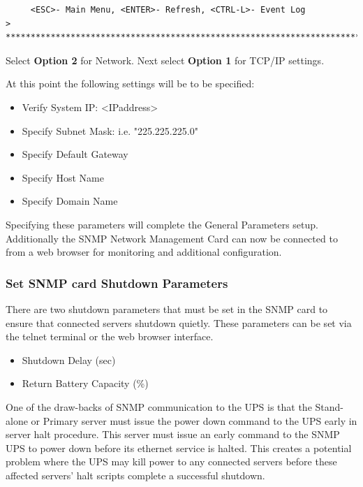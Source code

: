 {{{{{{{\begin{verbatim}
     <ESC>- Main Menu, <ENTER>- Refresh, <CTRL-L>- Event Log
>
*******************************************************************************
\end{verbatim}







\normalsize
Select {\bf Option 2} for Network.
Next select {\bf Option 1} for TCP/IP settings.

At this point the following settings will be to be specified:

\begin{itemize}
\item Verify System IP: <IPaddress>
\item Specify Subnet Mask:  i.e. "225.225.225.0"
\item Specify Default Gateway
\item Specify Host Name
\item Specify Domain Name
\end{itemize}

Specifying these parameters will complete the General Parameters setup.  
Additionally the SNMP Network Management Card can now be connected to from 
a web browser for monitoring and additional configuration.


\subsubsection*{Set SNMP card Shutdown Parameters}

There are two shutdown parameters that must be set in the SNMP card to ensure that
connected servers shutdown quietly.  These parameters can be set via the telnet terminal
or the web browser interface.

\begin{itemize}
\item Shutdown Delay (sec)
\item Return Battery Capacity (\%)
\end{itemize}

One of the draw-backs of SNMP communication to the UPS is that the Stand-alone or Primary
server must issue the power down command to the UPS early in server halt procedure.
This server must issue an early command to the SNMP UPS to power down before its ethernet
service is halted.  This creates a potential problem where the UPS may kill power to any
connected servers before these affected servers' halt scripts complete a successful shutdown.


}}}}}}}
